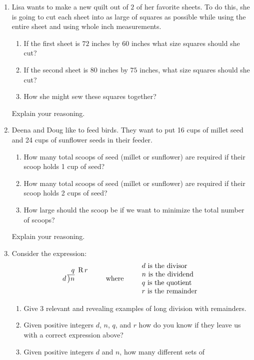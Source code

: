 \begin{problems}
\begin{enumerate}
\item Lisa wants to make a new quilt out of $2$ of her favorite
  sheets. To do this, she is going to cut each sheet into as large of
  squares as possible while using the entire sheet and using whole
  inch measurements. 
\begin{enumerate}
\item If the first sheet is $72$ inches by $60$ inches what size
  squares should she cut? 
\item If the second sheet is $80$ inches by $75$ inches, what size
  squares should she cut? 
\item How she might sew these squares together? 
\end{enumerate}
Explain your reasoning.
\item Deena and Doug like to feed birds. They want to put 16 cups of
  millet seed and 24 cups of sunflower seeds in their feeder.
\begin{enumerate}
\item How many total scoops of seed (millet or sunflower) are required
  if their scoop holds 1 cup of seed?
\item How many total scoops of seed (millet or sunflower) are required
  if their scoop holds 2 cups of seed?
\item How large should the scoop be if we want to minimize the total
  number of scoops?
\end{enumerate}
Explain your reasoning.
\item Consider the expression:
\[
d\,\begin{tabular}[b]{@{}r@{} r}
$q$ &\, R\,$r$\\ \cline{1-1}
\big)\begin{tabular}[t]{@{}l@{}}
$n$ 
\end{tabular}
\end{tabular}
\qquad\text{where}\qquad
\begin{tabular}{l}
$d$ is the divisor \\
$n$ is the dividend \\
$q$ is the quotient \\
$r$ is the remainder
\end{tabular}
\]
\begin{enumerate}
\item Give $3$ relevant and revealing examples of long division with
  remainders.
\item Given positive integers $d$, $n$, $q$, and $r$ how do you know
  if they leave us with a correct expression above?
\item Given positive integers $d$ and $n$, how many different sets of

\end{enumerate}
\end{enumerate}
\end{problems}
